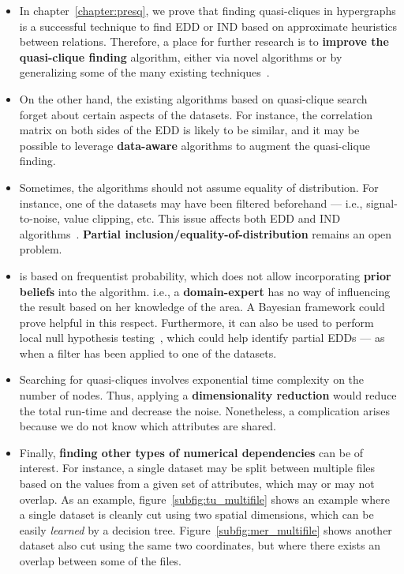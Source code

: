 \begin{itemize}
    \item In chapter~\ref{chapter:presq}, we prove that finding quasi-cliques in hypergraphs
    is a successful technique to find \gls{EDD} or \gls{IND} based on approximate heuristics
    between relations. Therefore, a place for further research is to
    \textbf{improve the quasi-clique finding} algorithm, either via novel algorithms or by
    generalizing some of the many existing techniques~\cite{WU2015693}.
            
    \item On the other hand, the existing algorithms based on quasi-clique search forget
    about certain aspects of the datasets. For instance, the correlation matrix on both
    sides of the \gls{EDD} is likely to be similar, and it may be possible to leverage
    \textbf{data-aware} algorithms to augment the quasi-clique finding.
    
    \item Sometimes, the algorithms should not assume equality of distribution. For instance, one of the
    datasets may have been filtered beforehand --- i.e., signal-to-noise, value clipping, etc. This issue affects
    both \gls{EDD} and \gls{IND} algorithms~\cite{koeller2003discovery}. \textbf{Partial inclusion/equality-of-distribution}
    remains an open problem.
            
    \item \PresQ is based on frequentist probability, which does not allow incorporating \textbf{prior beliefs}
    into the algorithm. i.e., a \textbf{domain-expert} has no way of influencing the result based
    on her knowledge of the area.
    A Bayesian framework could prove helpful in this respect. Furthermore,
    it can also be used to perform local null hypothesis testing~\cite{soriano2015bayesian}, which could help
    identify partial \glspl{EDD} --- as when a filter has been applied to one of the datasets.
    
    \item Searching for quasi-cliques involves exponential time complexity on the number of nodes.
    Thus, applying a \textbf{dimensionality reduction} would reduce the total
    run-time and decrease the noise. Nonetheless, a complication arises because
    we do not know which attributes are shared.
        
    \item Finally, \textbf{finding other types of numerical dependencies} can be of interest.
    For instance, a single dataset may be split between multiple files based on the values
    from a given set of attributes, which may or may not overlap.
    As an example, figure~\ref{subfig:tu_multifile} shows an example where a single dataset is
    cleanly cut using two spatial dimensions, which can be easily \emph{learned} by a decision tree.
    Figure~\ref{subfig:mer_multifile} shows another dataset also cut using the same two
    coordinates, but where there exists an overlap between some of the files.
\end{itemize}

